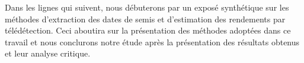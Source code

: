 \vspace{5mm} %

Dans les lignes qui suivent, nous débuterons par un exposé synthétique sur les méthodes d'extraction des dates de semis et d'estimation des rendements par télédétection. 
Ceci aboutira sur la présentation des méthodes adoptées dans ce travail et nous conclurons notre étude après la présentation des résultats obtenus et leur analyse critique.